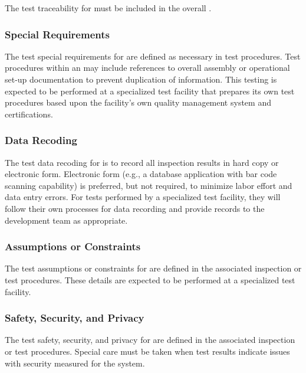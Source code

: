 The test traceability for \TestIdNameX must be included in the overall \RTVM.

\subsubsection{Special Requirements}
\label{loc:TestSpecialRequirements\TestIdName}

The test special requirements for \TestIdNameX are defined as necessary in test procedures.
Test procedures within an \STS may include references to overall assembly or operational set-up documentation to prevent duplication of information.
This testing is expected to be performed at a specialized test facility that prepares its own test procedures based upon the facility's own quality management system and certifications.


\subsubsection{Data Recoding}
\label{loc:TestDataRecoding\TestIdName}

The test data recoding for \TestIdNameX is to record all inspection results in hard copy or electronic form.
Electronic form (e.g., a database application with bar code scanning capability) is preferred, but not required, to minimize labor effort and data entry errors.
For tests performed by a specialized test facility, they will follow their own processes for data recording and provide records to the development team as appropriate.

\subsubsection{Assumptions or Constraints}
\label{loc:TestAssumptionsOrConstraints\TestIdName}

The test assumptions or constraints for \TestIdNameX are defined in the associated inspection or test procedures.
These details are expected to be performed at a specialized test facility.

\subsubsection{Safety, Security, and Privacy}
\label{loc:TestSafetySecurityPrivacy\TestIdName}

The test safety, security, and privacy for \TestIdNameX are defined in the associated inspection or test procedures.
Special care must be taken when test results indicate issues with security measured for the system.

